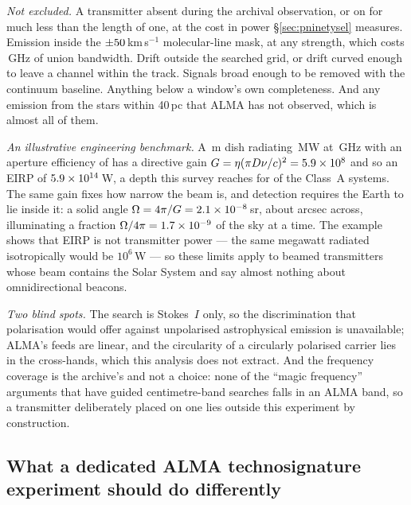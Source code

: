 \noindent\emph{Not excluded.} A transmitter absent during the archival
observation, or on for much less than the length of one, at the cost in power
\S\ref{sec:pninetysel} measures. Emission inside the
$\pm50$\,km\,s$^{-1}$ molecular-line mask, at any strength, which
costs \FrMaskLostGHz\,GHz of union bandwidth. Drift outside the searched grid, or
drift curved enough to leave a channel within the track. Signals broad enough
to be removed with the continuum baseline. Anything below a window's own
completeness. And any emission from the \NGaiaCensus{} stars within 40\,pc
that ALMA has not observed, which is almost all of them.

\noindent\emph{An illustrative engineering benchmark.} A \BenchDiam\,m dish
radiating \BenchPowerMW\,MW at \BenchFreqGHz\,GHz with an aperture efficiency
of \BenchEta{} has a directive gain $G=\eta(\pi D\nu/c)^{2}=5.9\times10^{8}$ and so
an EIRP of $5.9\times10^{14}$\,W, a depth this survey reaches for \BenchNSysA{} of
the \NSysClassA{} Class~A systems. The same gain fixes how narrow the beam is,
and detection requires the Earth to lie inside it: a solid angle
$\Omega=4\pi/G=2.1\times10^{-8}$\,sr, about \BmArcsec{} arcsec across, illuminating a
fraction $\Omega/4\pi=1.7\times10^{-9}$ of the sky at a time. The example shows that EIRP is not transmitter power --- the
same megawatt radiated isotropically would be $10^{6}$\,W --- so these limits
apply to beamed transmitters whose beam contains the Solar System and say
almost nothing about omnidirectional beacons.

\noindent\emph{Two blind spots.} The search is Stokes~$I$ only, so the
discrimination that polarisation would offer against unpolarised
astrophysical emission is unavailable; ALMA's feeds are linear, and the
circularity of a circularly polarised carrier lies in the cross-hands, which
this analysis does not extract. And the frequency coverage is the archive's
and not a choice: none of the ``magic frequency'' arguments that have guided
centimetre-band searches falls in an ALMA band, so a transmitter deliberately
placed on one lies outside this experiment by construction.

\subsection{What a dedicated ALMA technosignature experiment should do
differently}
\label{sec:future}

